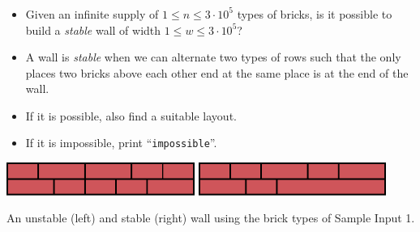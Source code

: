\begin{frame}
    \frametitle{\problemtitle}

    \begin{itemize}
        \item Given an infinite supply of $1\leq n\leq 3\cdot 10^5$ types of bricks, is it possible to
          build a \emph{stable} wall of width $1\leq w\leq 3\cdot 10^5$?
        \item A wall is \emph{stable} when we can alternate two types of rows
          such that the only places two bricks above each other end at the same
          place is at the end of the wall.
        \item If it is possible, also find a suitable layout.
        \item If it is impossible, print ``\texttt{impossible}''.
    \end{itemize}


  \vspace{1em}
  \centering
  \includegraphics[width=0.46\textwidth]{sample_wa}
  \hfill
  \includegraphics[width=0.46\textwidth]{sample}

  \small
  An unstable (left) and stable (right) wall using the brick types of Sample Input 1.
\end{frame}
